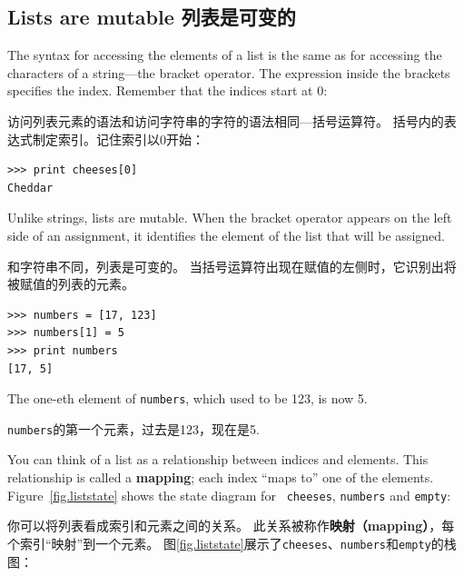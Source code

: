 \documentclass[10pt]{book}
\begin{document}
\begin{CJK}{UTF8}{gbsn}
\section{Lists are mutable 列表是可变的}
\label{mutable}

The syntax for accessing the elements of a list is the same as for
accessing the characters of a string---the bracket operator.  The
expression inside the brackets specifies the index.  Remember that the
indices start at 0:

访问列表元素的语法和访问字符串的字符的语法相同---括号运算符。
括号内的表达式制定索引。记住索引以0开始：

\begin{verbatim}
>>> print cheeses[0]
Cheddar
\end{verbatim}
%
Unlike strings, lists are mutable.  When the bracket operator appears
on the left side of an assignment, it identifies the element of the
list that will be assigned.

和字符串不同，列表是可变的。
当括号运算符出现在赋值的左侧时，它识别出将被赋值的列表的元素。

\begin{verbatim}
>>> numbers = [17, 123]
>>> numbers[1] = 5
>>> print numbers
[17, 5]
\end{verbatim}
%
The one-eth element of {\tt numbers}, which
used to be 123, is now 5.

{\tt numbers}的第一个元素，过去是123，现在是5.

You can think of a list as a relationship between indices and
elements.  This relationship is called a {\bf mapping}; each index
``maps to'' one of the elements.  Figure~\ref{fig.liststate} shows 
the state diagram for {\tt
cheeses}, {\tt numbers} and {\tt empty}:

你可以将列表看成索引和元素之间的关系。
此关系被称作{\bf 映射（mapping）}，每个索引``映射''到一个元素。
图\ref{fig.liststate}展示了{\tt cheeses}、{\tt numbers}和{\tt empty}的栈图：


\end{CJK}
\end{document}
